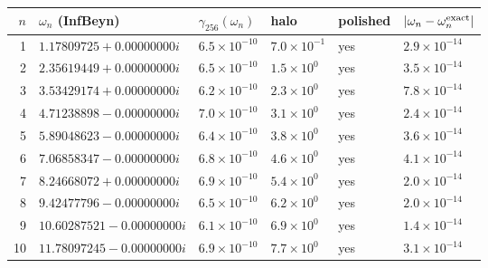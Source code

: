 \begin{tabular}{rlllll}
\toprule
$n$ & $\omega_n$ (InfBeyn) & $\gamma_{256}(\omega_n)$ & halo & polished & $|\omega_n-\omega_n^{\rm exact}|$\\
\midrule
1 & $1.17809725+0.00000000i$ & $6.5\times10^{-10}$ & $7.0\times10^{-1}$ & yes & $2.9\times10^{-14}$\\
2 & $2.35619449+0.00000000i$ & $6.5\times10^{-10}$ & $1.5\times10^{0}$ & yes & $3.5\times10^{-14}$\\
3 & $3.53429174+0.00000000i$ & $6.2\times10^{-10}$ & $2.3\times10^{0}$ & yes & $7.8\times10^{-14}$\\
4 & $4.71238898-0.00000000i$ & $7.0\times10^{-10}$ & $3.1\times10^{0}$ & yes & $2.4\times10^{-14}$\\
5 & $5.89048623-0.00000000i$ & $6.4\times10^{-10}$ & $3.8\times10^{0}$ & yes & $3.6\times10^{-14}$\\
6 & $7.06858347-0.00000000i$ & $6.8\times10^{-10}$ & $4.6\times10^{0}$ & yes & $4.1\times10^{-14}$\\
7 & $8.24668072+0.00000000i$ & $6.9\times10^{-10}$ & $5.4\times10^{0}$ & yes & $2.0\times10^{-14}$\\
8 & $9.42477796-0.00000000i$ & $6.5\times10^{-10}$ & $6.2\times10^{0}$ & yes & $2.0\times10^{-14}$\\
9 & $10.60287521-0.00000000i$ & $6.1\times10^{-10}$ & $6.9\times10^{0}$ & yes & $1.4\times10^{-14}$\\
10 & $11.78097245-0.00000000i$ & $6.9\times10^{-10}$ & $7.7\times10^{0}$ & yes & $3.1\times10^{-14}$\\
\bottomrule
\end{tabular}
